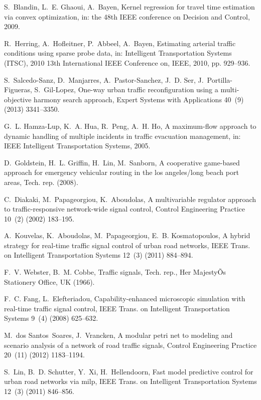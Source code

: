 \documentclass[10pt,onecolumn]{article}
\begin{document}
\begin{thebibliography}{00}
S.~Blandin, L.~E. Ghaoui, A.~Bayen, Kernel regression for travel time
  estimation via convex optimization, in: the 48th IEEE conference on Decision
  and Control, 2009.

R.~Herring, A.~Hofleitner, P.~Abbeel, A.~Bayen, Estimating arterial traffic
  conditions using sparse probe data, in: Intelligent Transportation Systems
  (ITSC), 2010 13th International IEEE Conference on, IEEE, 2010, pp. 929--936.

S.~Salcedo-Sanz, D.~Manjarres, A.~Pastor-Sanchez, J.~D. Ser,
  J.~Portilla-Figueras, S.~Gil-Lopez, {One-way urban traffic reconfiguration
  using a multi-objective harmony search approach}, Expert Systems with
  Applications 40~(9) (2013) 3341--3350.

G.~L. Hamza-Lup, K.~A. Hua, R.~Peng, A.~H. Ho, A maximum-flow approach to
  dynamic handling of multiple incidents in traffic evacuation management, in:
  IEEE Intelligent Transportation Systems, 2005.

D.~Goldstein, H.~L. Griffin, H.~Lin, M.~Sanborn, A cooperative game-based
  approach for emergency vehicular routing in the los angeles/long beach port
  areas, Tech. rep. (2008).

C.~Diakaki, M.~Papageorgiou, K.~Aboudolas, A multivariable regulator approach
  to traffic-responsive network-wide signal control, Control Engineering
  Practice 10~(2) (2002) 183--195.

A.~Kouvelas, K.~Aboudolas, M.~Papageorgiou, E.~B. Kosmatopoulos, A hybrid
  strategy for real-time traffic signal control of urban road networks, IEEE
  Trans. on Intelligent Transportation Systems 12~(3) (2011) 884--894.

F.~V. Webster, B.~M. Cobbe, Traffic signals, Tech. rep., Her MajestyÕs
  Stationery Office, UK (1966).

F.~C. Fang, L.~Elefteriadou, Capability-enhanced microscopic simulation with
  real-time traffic signal control, IEEE Trans. on Intelligent Transportation
  Systems 9~(4) (2008) 625--632.

M.~dos Santos~Soares, J.~Vrancken, A modular petri net to modeling and scenario
  analysis of a network of road traffic signals, Control Engineering Practice
  20~(11) (2012) 1183--1194.

S.~Lin, B.~D. Schutter, Y.~Xi, H.~Hellendoorn, Fast model predictive control
  for urban road networks via milp, IEEE Trans. on Intelligent Transportation
  Systems 12~(3) (2011) 846--856.


\end{thebibliography}
\end{document}
